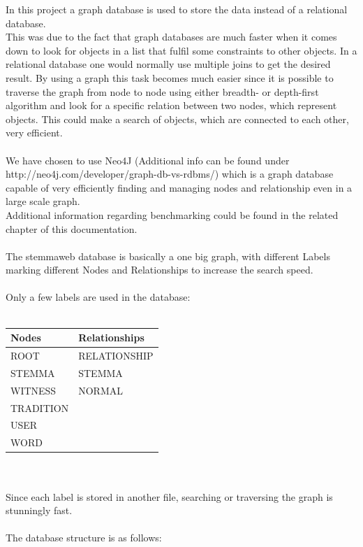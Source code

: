 \documentclass[11pt,fleqn,openany]{book} %
\begin{document}
In this project a graph database is used to store the data instead of a relational database.\\ This was due to the fact that graph databases are much faster when it comes down to look for objects in a list that fulfil some constraints to other objects. In a relational database one would normally use multiple joins to get the desired result. By using a graph this task becomes much easier since it is possible to traverse the graph from node to node using either breadth- or depth-first algorithm and look for a specific relation between two nodes, which represent objects. This could make a search of objects, which are connected to each other, very efficient. \\ \quad \\We have chosen to use Neo4J (Additional info can be found under http://neo4j.com/developer/graph-db-vs-rdbms/) which is a graph database capable of very efficiently finding and managing nodes and relationship even in a large scale graph.\\
Additional information regarding benchmarking could be found in the related chapter of this documentation. \\ \quad \\The stemmaweb database is basically a one big graph, with different Labels marking different Nodes and Relationships to increase the search speed. \\ \quad \\Only a few labels are used in the database:\\ \quad \\
\begin{tabular}{|l|l|}
\hline 
\textbf{Nodes} & \textbf{Relationships} \\ 
\hline 
ROOT & RELATIONSHIP \\ 
\hline 
STEMMA & STEMMA \\ 
\hline 
WITNESS & NORMAL \\ 
\hline 
TRADITION &  \\ 
\hline 
USER &  \\ 
\hline 
WORD &  \\ 
\hline 
\end{tabular} \\\\
Since each label is stored in another file, searching or traversing the graph is stunningly fast. \\ \quad \\ The database structure is as follows:
\end{document}

